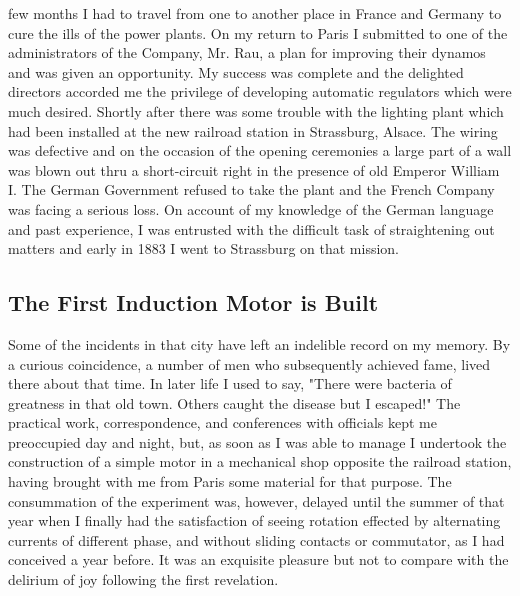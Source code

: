 \documentclass[a4paper,12pt,english,twoside,openright]{memoir}
\begin{document}
 few months I had to travel from one to another 
place in France and Germany to cure the ills of the power plants.  On my return to Paris I 
submitted to one of the administrators of the Company, Mr. Rau, a plan for improving their 
dynamos and was given an opportunity.  My success was complete and the delighted directors accorded me the privilege of developing automatic regulators which were much desired.  Shortly 
after there was some trouble with the lighting plant which had been installed at the new railroad 
station in Strassburg, Alsace.  The wiring was defective and on the occasion of the opening 
ceremonies a large part of a wall was blown out thru a short-circuit right in the presence of old 
Emperor William I.  The German Government refused to take the plant and the French Company 
was facing a serious loss.  On account of my knowledge of the German language and past 
experience, I was entrusted with the difficult task of straightening out matters and early in 1883 I 
went to Strassburg on that mission.  

\vspace{-1em}
\subsection{The First Induction Motor is Built}

Some of the incidents in that city have left an indelible record on my memory.  By a curious 
coincidence, a number of men who subsequently achieved fame, lived there about that time.  In 
later life I used to say, "There were bacteria of greatness in that old town.  Others caught the 
disease but I escaped!" The practical work, correspondence, and conferences with officials kept 
me preoccupied day and night, but, as soon as I was able to manage I undertook the construction 
of a simple motor in a mechanical shop opposite the railroad station, having brought with me from 
Paris some material for that purpose.  The consummation of the experiment was, however, 
delayed until the summer of that year when I finally had the satisfaction of seeing rotation effected 
by alternating currents of different phase, and without sliding contacts or commutator, as I had 
conceived a year before.  It was an exquisite pleasure but not to compare with the delirium of joy 
following the first revelation.  
\end{document}
